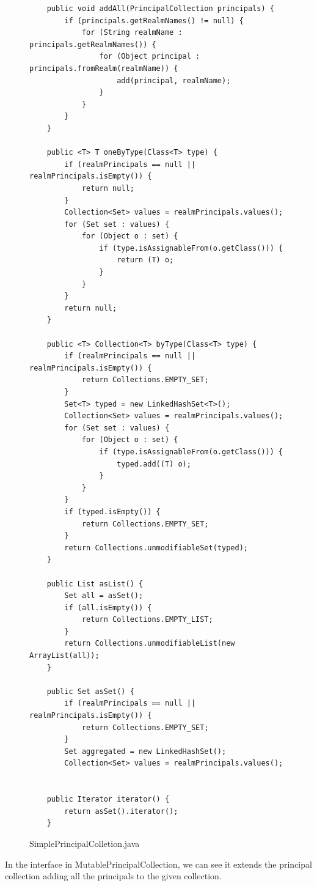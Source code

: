 \begin{figure}[!tbp]
\begin{lstlisting}
    public void addAll(PrincipalCollection principals) {
        if (principals.getRealmNames() != null) {
            for (String realmName : principals.getRealmNames()) {
                for (Object principal : principals.fromRealm(realmName)) {
                    add(principal, realmName);
                }
            }
        }
    }

    public <T> T oneByType(Class<T> type) {
        if (realmPrincipals == null || realmPrincipals.isEmpty()) {
            return null;
        }
        Collection<Set> values = realmPrincipals.values();
        for (Set set : values) {
            for (Object o : set) {
                if (type.isAssignableFrom(o.getClass())) {
                    return (T) o;
                }
            }
        }
        return null;
    }

    public <T> Collection<T> byType(Class<T> type) {
        if (realmPrincipals == null || realmPrincipals.isEmpty()) {
            return Collections.EMPTY_SET;
        }
        Set<T> typed = new LinkedHashSet<T>();
        Collection<Set> values = realmPrincipals.values();
        for (Set set : values) {
            for (Object o : set) {
                if (type.isAssignableFrom(o.getClass())) {
                    typed.add((T) o);
                }
            }
        }
        if (typed.isEmpty()) {
            return Collections.EMPTY_SET;
        }
        return Collections.unmodifiableSet(typed);
    }

    public List asList() {
        Set all = asSet();
        if (all.isEmpty()) {
            return Collections.EMPTY_LIST;
        }
        return Collections.unmodifiableList(new ArrayList(all));
    }

    public Set asSet() {
        if (realmPrincipals == null || realmPrincipals.isEmpty()) {
            return Collections.EMPTY_SET;
        }
        Set aggregated = new LinkedHashSet();
        Collection<Set> values = realmPrincipals.values();


    public Iterator iterator() {
        return asSet().iterator();
    }
\end{lstlisting}
\caption{SimplePrincipalColletion.java}
\label{SimplePrincipalColletion}
\end{figure}

In the interface in MutablePrincipalCollection, we can see it extends the principal collection adding all the principals to the given collection.

